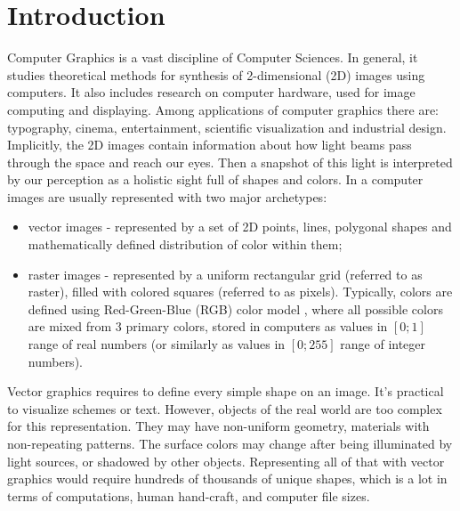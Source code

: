 \chapter{Introduction}

Computer Graphics is a vast discipline of Computer Sciences. In general, it studies theoretical methods for synthesis of 2-dimensional (2D) images using computers. It also includes research on computer hardware, used for image computing and displaying. Among applications of computer graphics there are: typography, cinema, entertainment, scientific visualization and industrial design. Implicitly, the 2D images contain information about how light beams pass through the space and reach our eyes. Then a snapshot of this light is interpreted by our perception as a holistic sight full of shapes and colors. In a computer images are usually represented with two major archetypes:

\begin{itemize}
	\item vector images \cite{aux:vector14} - represented by a set of 2D points, lines, polygonal shapes and mathematically defined distribution of color within them;
	\item raster images \cite{aux:raster94} - represented by a uniform rectangular grid (referred to as raster), filled with colored squares (referred to as pixels). Typically, colors are defined using Red-Green-Blue (RGB) color model \cite{aux:color05}, where all possible colors are mixed from 3 primary colors, stored in computers as values in $[0;1]$ range of real numbers (or similarly as values in $[0;255]$ range of integer numbers).
\end{itemize}

Vector graphics requires to define every simple shape on an image. It's practical to visualize schemes or text. However, objects of the real world are too complex for this representation. They may have non-uniform geometry, materials with non-repeating patterns. The surface colors may change after being illuminated by light sources, or shadowed by other objects. Representing all of that with vector graphics would require hundreds of thousands of unique shapes, which is a lot in terms of computations, human hand-craft, and computer file sizes. 

